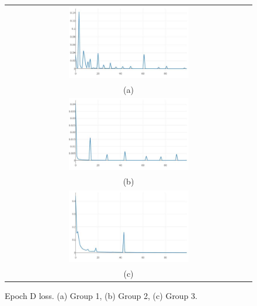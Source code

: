 \documentclass[10pt,twocolumn,letterpaper]{article}
\begin{document}
\begin{figure}%
\centering\begin{tabular}{c}
\includegraphics[width=0.5\textwidth]{fig19-a}\\
(a)\\[3ex]%
\includegraphics[width=0.5\textwidth]{fig19-b}\\
(b)\\[3ex]
\includegraphics[width=0.5\textwidth]{fig19-c}\\
(c)
\end{tabular}
\caption{Epoch D loss. (a) Group 1, (b) Group 2, (c) Group 3.}%
\label{fig19}%
\end{figure}
\end{document}
